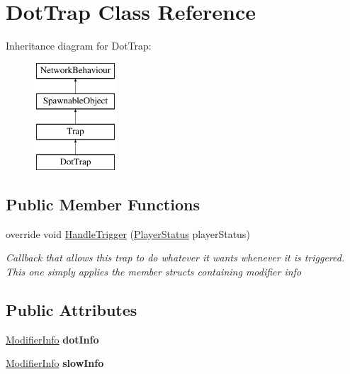 \hypertarget{class_dot_trap}{}\section{Dot\+Trap Class Reference}
\label{class_dot_trap}
Inheritance diagram for Dot\+Trap\+:\begin{figure}[H]
\begin{center}
\leavevmode
\includegraphics[height=4.000000cm]{class_dot_trap}
\end{center}
\end{figure}
\subsection*{Public Member Functions}
\begin{DoxyCompactItemize}
\item 
override void \hyperlink{class_dot_trap_a40e21aaaf98d98cbf006a4c70d5d3809}{Handle\+Trigger} (\hyperlink{class_player_status}{Player\+Status} player\+Status)
\begin{DoxyCompactList}\small\item\em Callback that allows this trap to do whatever it wants whenever it is triggered. This one simply applies the member structs containing modifier info \end{DoxyCompactList}\end{DoxyCompactItemize}
\subsection*{Public Attributes}
\begin{DoxyCompactItemize}
\item 
\hypertarget{class_dot_trap_a3c62fad9686284acc6bf8e876823a88f}{}\label{class_dot_trap_a3c62fad9686284acc6bf8e876823a88f} 
\hyperlink{struct_modifier_info}{Modifier\+Info} {\bfseries dot\+Info}
\item 
\hypertarget{class_dot_trap_ac0b08d5aee22df513a29ee341f4d01c9}{}\label{class_dot_trap_ac0b08d5aee22df513a29ee341f4d01c9} 
\hyperlink{struct_modifier_info}{Modifier\+Info} {\bfseries slow\+Info}
\end{DoxyCompactItemize}
